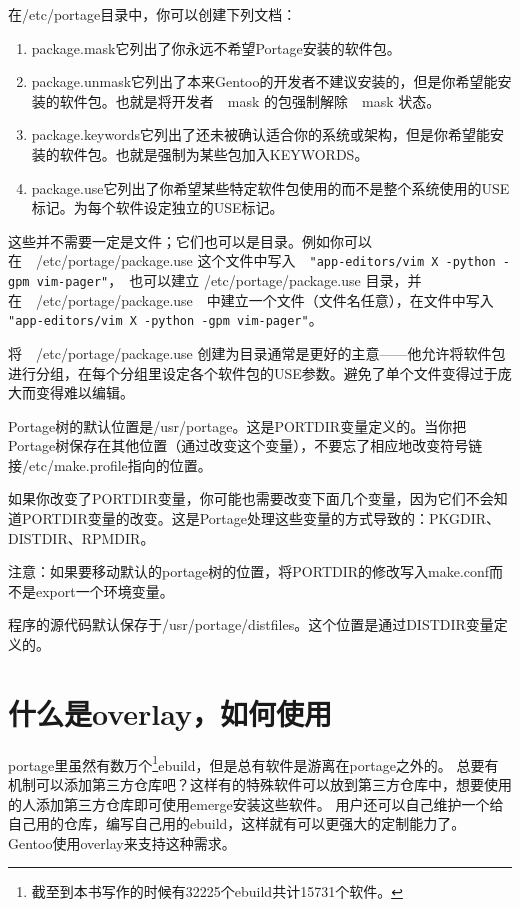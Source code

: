 在/etc/portage目录中，你可以创建下列文档：

\begin{enumerate}
\item package.mask它列出了你永远不希望Portage安装的软件包。
\item package.unmask它列出了本来Gentoo的开发者不建议安装的，但是你希望能安装的软件包。也就是将开发者　mask 的包强制解除　mask 状态。
\item package.keywords它列出了还未被确认适合你的系统或架构，但是你希望能安装的软件包。也就是强制为某些包加入KEYWORDS。
\item package.use它列出了你希望某些特定软件包使用的而不是整个系统使用的USE标记。为每个软件设定独立的USE标记。
\end{enumerate}

这些并不需要一定是文件；它们也可以是目录。例如你可以在　/etc/portage/package.use 这个文件中写入　\texttt{"app-editors/vim X -python -gpm vim-pager"}，　也可以建立
/etc/portage/package.use 目录，并在　/etc/portage/package.use　中建立一个文件（文件名任意），在文件中写入 \texttt{"app-editors/vim X -python -gpm vim-pager"}。

将　/etc/portage/package.use 创建为目录通常是更好的主意——他允许将软件包进行分组，在每个分组里设定各个软件包的USE参数。避免了单个文件变得过于庞大而变得难以编辑。

\vspace{3ex}

Portage树的默认位置是/usr/portage。这是PORTDIR变量定义的。当你把Portage树保存在其他位置（通过改变这个变量），不要忘了相应地改变符号链接/etc/make.profile指向的位置。

如果你改变了PORTDIR变量，你可能也需要改变下面几个变量，因为它们不会知道PORTDIR变量的改变。这是Portage处理这些变量的方式导致的：PKGDIR、DISTDIR、RPMDIR。

\begin{notice}
注意：如果要移动默认的portage树的位置，将PORTDIR的修改写入make.conf而不是export一个环境变量。
\end{notice}

程序的源代码默认保存于/usr/portage/distfiles。这个位置是通过DISTDIR变量定义的。

\section{什么是overlay，如何使用}\label{sec:overlay}

portage里虽然有数万个\footnote{截至到本书写作的时候有32225个ebuild共计15731个软件。}ebuild，但是总有软件是游离在portage之外的。
总要有机制可以添加第三方仓库吧？这样有的特殊软件可以放到第三方仓库中，想要使用的人添加第三方仓库即可使用emerge安装这些软件。
用户还可以自己维护一个给自己用的仓库，编写自己用的ebuild，这样就有可以更强大的定制能力了。
Gentoo使用overlay来支持这种需求。

